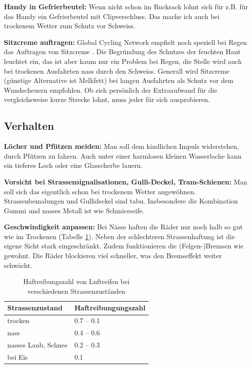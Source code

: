 \textbf{Handy in Gefrierbeutel:}
Wenn nicht schon im Rucksack lohnt sich für z.B. für das Handy ein Gefrierbeutel mit Clipverschluss.
Das mache ich auch bei trockenem Wetter zum Schutz vor Schweiss.

\textbf{Sitzcreme auftragen:}
Global Cycling Network empfielt noch speziell bei Regen das Auftragen von Sitzcreme \cite{gcn2013rain,gcn2015rain}.
Die Begründung des Schutzes der feuchten Haut leuchtet ein, das ist aber kaum nur ein Problem bei Regen,
die Stelle wird auch bei trockenen Ausfahrten nass durch den Schweiss.
Generall wird Sitzcreme (günstige Alternative ist Melkfett) bei langen Ausfahrten als Schutz vor dem Wundscheuern empfohlen.
Ob sich persönlich der Extraaufwand für die vergleichsweise kurze Strecke lohnt, muss jeder für sich ausprobieren.

\subsection{Verhalten}

\textbf{Löcher und Pfützen meiden:}
Man soll dem kindlichen Impuls widerstehen, durch Pfützen zu fahren.
Auch unter einer harmlosen kleinen Wasserlache kann ein tieferes Loch oder eine Glasscherbe lauern.

\textbf{Vorsicht bei Strassensignalisationen, Gulli-Deckel, Tram-Schienen:}
Man soll sich das eigentlich schon bei trockenem Wetter angewöhnen.
Strassenbemalungen und Gullideckel sind tabu.
Insbesondere die Kombination Gummi und nasses Metall ist wie Schmierseife.

\textbf{Geschwindigkeit anpassen:}
Bei Nässe haften die Räder nur noch halb so gut wie im Trockenen (Tabelle \ref{tab:haftreibung}).
Neben der schlechteren Strassenhaftung ist die eigene Sicht stark eingeschränkt.
Zudem funktionieren die (Felgen-)Bremsen wie gewohnt.
Die Räder blockieren viel schneller, was den Bremseffekt weiter schwächt.

\begin{table}
  \centering
  \begin{tabular}{ll}
    \toprule
    Strassenzustand & Haftreibungungszahl \\
    \midrule
    trocken         & 0.7 -- 0.1 \\
    nass            & 0.4 -- 0.6 \\
    nasses Laub, Schnee & 0.2 -- 0.3 \\
    bei Eis         & 0.1 \\
    \bottomrule
  \end{tabular}
  \caption{Haftreibungszahl von Luftreifen bei verschiedenen Strassenzuständen \protect\cite{Strommer2016haftreibung}}
  \label{tab:haftreibung}
\end{table}



